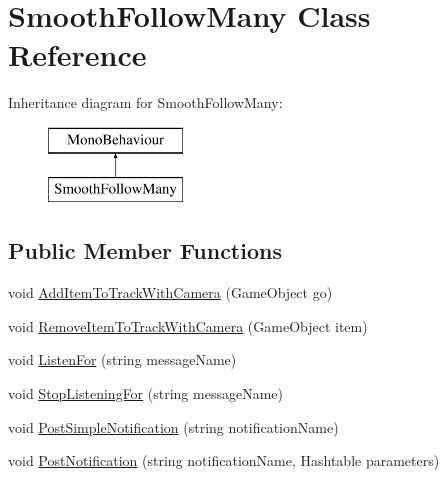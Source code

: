 \hypertarget{class_smooth_follow_many}{}\section{Smooth\+Follow\+Many Class Reference}
\label{class_smooth_follow_many}
Inheritance diagram for Smooth\+Follow\+Many\+:\begin{figure}[H]
\begin{center}
\leavevmode
\includegraphics[height=2.000000cm]{class_smooth_follow_many}
\end{center}
\end{figure}
\subsection*{Public Member Functions}
\begin{DoxyCompactItemize}
\item 
void \hyperlink{class_smooth_follow_many_a58c7ce2cdfcf6fad94bc1915440dcf88}{Add\+Item\+To\+Track\+With\+Camera} (Game\+Object go)
\item 
void \hyperlink{class_smooth_follow_many_a28ff0fde3822327fe1ca53588e7657df}{Remove\+Item\+To\+Track\+With\+Camera} (Game\+Object item)
\item 
void \hyperlink{class_smooth_follow_many_a4aa0fd1117cfbbf381956706bfea0940}{Listen\+For} (string message\+Name)
\item 
void \hyperlink{class_smooth_follow_many_a9170a8a58a2fb8557867cbd53ffa9eda}{Stop\+Listening\+For} (string message\+Name)
\item 
void \hyperlink{class_smooth_follow_many_ade58d7656521cb1a4e605e20fb119c69}{Post\+Simple\+Notification} (string notification\+Name)
\item 
void \hyperlink{class_smooth_follow_many_ab2bd59d504429d5151010fd71c67f330}{Post\+Notification} (string notification\+Name, Hashtable parameters)
\end{DoxyCompactItemize}
